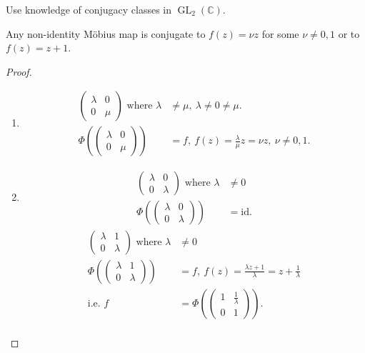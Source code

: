 Use knowledge of conjugacy classes in $\operatorname{GL}_2(\mathbb{C})$.

\begin{theorem} \label{thm:17}
    Any non-identity M\"obius map is conjugate to $f(z) = \nu z$ for some $\nu \neq 0, 1$ or to $f(z) = z + 1$.
\end{theorem} 

\begin{proof} ~
    \begin{enumerate}
        \item
        \begin{align*}
            \begin{pmatrix}\lambda & 0 \\0 & \mu\end{pmatrix} \text{ where } \lambda &\neq \mu,\ \lambda \neq 0 \neq \mu. \\
            \Phi \left( \begin{pmatrix}\lambda & 0 \\0 & \mu\end{pmatrix} \right) &= f,\ f(z) = \frac{\lambda}{\mu} z = \nu z,\ \nu \neq 0, 1.
        \end{align*}
        \item
        \begin{align*}
            \begin{pmatrix}\lambda & 0 \\0 & \lambda \end{pmatrix} \text{ where } \lambda &\neq 0 \\
            \Phi \left( \begin{pmatrix}\lambda & 0 \\0 & \lambda \end{pmatrix} \right) &= \text{id}.
        \end{align*}
        \mathitem \begin{align*}
            \begin{pmatrix}\lambda & 1 \\0 & \lambda\end{pmatrix} \text{ where } \lambda &\neq 0 \\
            \Phi \left( \begin{pmatrix}\lambda & 1 \\0 & \lambda \end{pmatrix} \right) &= f,\ f(z) = \frac{\lambda z + 1}{\lambda} = z + \frac{1}{\lambda} \\
            \text{i.e. } f &= \Phi \left( \begin{pmatrix}1 & \frac{1}{\lambda} \\0 & 1\end{pmatrix} \right). \\

\end{align*}
\end{enumerate}
\end{proof}
